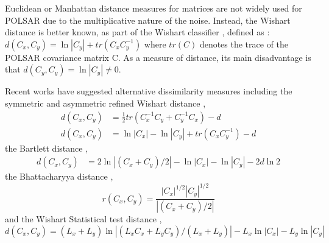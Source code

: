 \documentclass[printer]{tRSL2e}
\begin{document}
Euclidean or Manhattan distance measures for matrices are not widely used 
for POLSAR due to the multiplicative nature of the noise.
Instead, the Wishart distance is better known, as part of the Wishart classifier \citep{Lee_1999_TGRS}, defined as \citep{Lee_1994_IJRS_2299}:
$d(C_x,C_y) = \ln|C_y| + tr(C_xC_y^{-1})$
where $tr(C)$ denotes the trace of the POLSAR covariance matrix C. 
As a measure of distance, its main disadvantage is that $d(C_y,C_y) = \ln|C_y| \neq 0$.

Recent works have suggested alternative dissimilarity measures including the symmetric and asymmetric refined Wishart distance \citep{Anfinsen_2007_ESA_POLINSAR},
\vspace{-2mm}
\begin{align}
  d(C_x,C_y) &= \frac{1}{2} tr(C_x^{-1}C_y + C_y^{-1}C_x) - d \\
    d(C_x,C_y) &= \ln|C_x| - \ln|C_y| + tr(C_xC_y^{-1}) - d
\end{align}
\vspace{-2mm}
the Bartlett distance \citep{Kersten_2005_TGRS_519},
     \vspace{-2mm}
  \begin{align}
  d(C_x,C_y) &= 2 \ln |(C_x+C_y)/2| - \ln |C_x| - \ln |C_y| - 2d\ln2
  \end{align}
     \vspace{-2mm}
the Bhattacharyya distance \citep{Lee_2011_IGARSS_3740},
     \vspace{-2mm}
\begin{equation}
  r(C_x,C_y) = \frac{|C_x|^{1/2} |C_y|^{1/2}}{|(C_x+C_y)/2|}
\end{equation}
     \vspace{-2mm}
and the Wishart Statistical test distance \citep{Cao_2007_TGRS_3454},
     \vspace{-2mm}
\begin{equation}
  d(C_x,C_y) = (L_x + L_y) \ln|(L_xC_x+L_yC_y)/(L_x+L_y)| - L_x \ln|C_x| - L_y\ln|C_y|
\end{equation}
\end{document}
